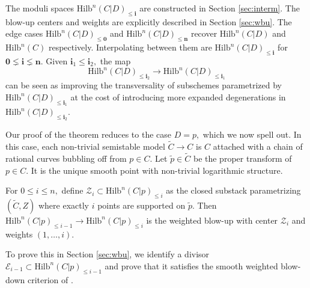 \documentclass[10.5pt]{amsart}
\theoremstyle{definition}
\newenvironment{customthm}[1]
  {\renewcommand\theinnercustomthm{#1}\innercustomthm}
  {\endinnercustomthm}
\theoremstyle{definition}
\theoremstyle{definition}
\theoremstyle{definition}
\newcommand{\Hilb}{\mathrm{Hilb}}
\newcommand{\cZ}{\mathcal{Z}}
\newcommand{\bi}{\boldsymbol{i}}
\newcommand{\terry}[1]{{\color{pink} \sf  Terry: [#1]}}
\newcommand{\veronica}[1]{{\color{orange2} \sf  Veronica: [#1]}}
\begin{document}
The moduli spaces $\Hilb^n(C|D)_{\leq \bi}$ are constructed in Section \ref{sec:interm}. The blow-up centers and weights are explicitly described in Section \ref{sec:wbu}. The edge cases $\Hilb^n(C|D)_{\leq \mathbf{0}}$ and $\Hilb^n(C|D)_{\leq \mathbf{n}}$ recover $\Hilb^n(C|D)$ and $\Hilb^n(C)$ respectively. Interpolating between them are $\Hilb^n(C|D)_{\leq \bi}$ for $\mathbf{0}\lneq \bi\lneq \mathbf{n}$. Given $\bi_1\leq \bi_2,$ the map \[\Hilb^n(C|D)_{\leq \bi_2}\to \Hilb^n(C|D)_{\leq \bi_1}\] can be seen as improving the transversality of subschemes parametrized by $\Hilb^n(C|D)_{\leq \bi_1}$ at the cost of introducing more expanded degenerations in $\Hilb^n(C|D)_{\leq \bi_2}.$ %

Our proof of the theorem reduces to the case $D = p,$ which we now spell out. In this case, each non-trivial semistable model $\tilde{C}\to C$ is $C$ attached with a chain of rational curves bubbling off from $p\in C$. Let $\tilde{p}\in \tilde{C}$ be the proper transform of $p\in C.$ It is the unique smooth point with non-trivial logarithmic structure.


\begin{customthm}{\ref{thm:D=p}}
  For $0\leq i\leq n,$ define $\cZ_i\subset \mathrm{Hilb}^n(C|p)_{\leq i}$ as the closed substack parametrizing $(\tilde{C}, Z)$ where exactly $i$ points are supported on $\tilde{p}.$ Then $ \mathrm{Hilb}^n(C|p)_{\leq i-1}\to \mathrm{Hilb}^n(C|p)_{\leq i}$ is the weighted blow-up with center $\cZ_i$ and weights $(1,\dots,i).$
\end{customthm}

To prove this in Section \ref{sec:wbu}, we identify a divisor $\mathcal{E}_{i-1}\subset \Hilb^n(C|p)_{\leq i-1}$ and prove that it satisfies the smooth weighted blow-down criterion of \cite{arena2024criterion}.
\end{document}
